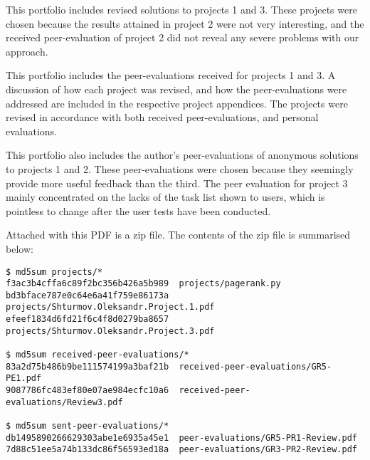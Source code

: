 
This portfolio includes revised solutions to projects 1 and 3. These projects
were chosen because the results attained in project 2 were not very
interesting, and the received peer-evaluation of project 2 did not reveal any
severe problems with our approach.

This portfolio includes the peer-evaluations received for projects 1 and 3. A
discussion of how each project was revised, and how the peer-evaluations were
addressed are included in the respective project appendices. The projects were
revised in accordance with both received peer-evaluations, and personal
evaluations.

This portfolio also includes the author's peer-evaluations of anonymous
solutions to projects 1 and 2.  These peer-evaluations were chosen because they
seemingly provide more useful feedback than the third. The peer evaluation for
project 3 mainly concentrated on the lacks of the task list shown to users,
which is pointless to change after the user tests have been conducted.

Attached with this PDF is a zip file. The contents of the zip file is
summarised below:

\begin{lstlisting}
$ md5sum projects/*
f3ac3b4cffa6c89f2bc356b426a5b989  projects/pagerank.py
bd3bface787e0c64e6a41f759e86173a  projects/Shturmov.Oleksandr.Project.1.pdf
efeef1834d6fd21f6c4f8d0279ba8657  projects/Shturmov.Oleksandr.Project.3.pdf

$ md5sum received-peer-evaluations/*
83a2d75b486b9be111574199a3baf21b  received-peer-evaluations/GR5-PE1.pdf
9087786fc483ef80e07ae984ecfc10a6  received-peer-evaluations/Review3.pdf

$ md5sum sent-peer-evaluations/*
db1495890266629303abe1e6935a45e1  peer-evaluations/GR5-PR1-Review.pdf
7d88c51ee5a74b133dc86f56593ed18a  peer-evaluations/GR3-PR2-Review.pdf
\end{lstlisting}

